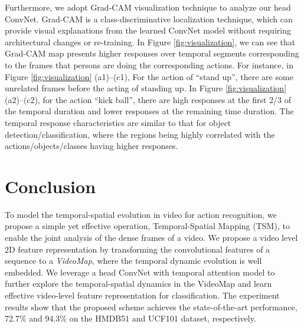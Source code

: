 \documentclass[english, 10pt, twocolumn, twoside]{IEEEtran}
\begin{document}
Furthermore, we adopt Grad-CAM visualization technique \cite{Selvaraju2016Grad} to analyze our head ConvNet. Grad-CAM is a class-discriminative localization technique, which can provide visual explanations from the learned ConvNet model without requiring architectural changes or re-training. In Figure \ref{fig:visualization}, we can see that Grad-CAM map presents higher responses over temporal segments corresponding to the frames that persons are doing the corresponding actions. For instance, in Figure \ref{fig:visualization} (a1)--(c1), For the action of ``stand up'', there are some unrelated frames before the acting of standing up. In Figure \ref{fig:visualization} (a2)--(c2), for the action ``kick ball'', there are high responses at the first 2/3 of the temporal duration and lower responses at the remaining time duration. The temporal response characteristics are similar to that for object detection/classification, where the regions being highly correlated with the actions/objects/classes having higher responses.

\section{Conclusion}

To model the temporal-spatial evolution in video for action recognition, we propose a simple yet effective operation, Temporal-Spatial Mapping (TSM), to enable the joint analysis of the dense frames of a video. We propose a video level 2D feature representation by transforming the convolutional features of a sequence to a \emph{VideoMap}, where the temporal dynamic evolution is well embedded. We leverage a head ConvNet with temporal attention model to further explore the temporal-spatial dynamics in the VideoMap and learn effective video-level feature representation for classification. The experiment results show that the proposed scheme achieves the state-of-the-art performance, 72.7\% and 94.3\% on the HMDB51 and UCF101 dataset, respectively.









\ifCLASSOPTIONcaptionsoff
  \newpage
\fi







\end{document}
